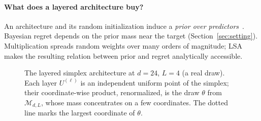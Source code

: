 \documentclass[anon]{alt2027}
\newcommand{\LSA}{\mathcal{M}_{d,L}}
\begin{document}
\paragraph{What does a layered architecture buy?}
An architecture and its random initialization induce a \emph{prior over predictors}~\citep{MerhavFeder1998,feder2025framework}. Bayesian regret depends on the prior mass near the target (Section~\ref{sec:setting}). Multiplication spreads random weights over many orders of magnitude; LSA makes the resulting relation between prior and regret analytically accessible.

\begin{figure}[htp]
\centering
\resizebox{\columnwidth}{!}{}
\caption{The layered simplex architecture at $d=24$, $L=4$ (a real draw). Each layer $U^{(\ell)}$ is an independent uniform point of the simplex; their coordinate-wise product, renormalized, is the draw $\theta$ from $\LSA$, whose mass concentrates on a few coordinates. The dotted line marks the largest coordinate of $\theta$.}
\label{fig:lsa}
\end{figure}
\end{document}
